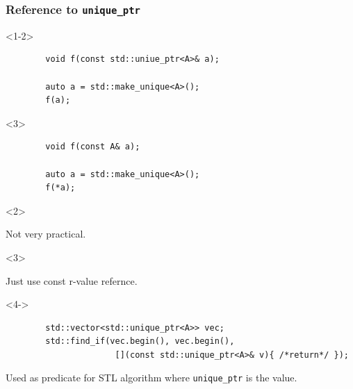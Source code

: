 \documentclass{beamer}
\begin{document}
\begin{frame}[fragile,t]
\frametitle{Reference to \texttt{unique\_ptr}}
    \begin{onlyenv}<1-2>
    \begin{lstlisting}
        void f(const std::uniue_ptr<A>& a);

        auto a = std::make_unique<A>();
        f(a);
    \end{lstlisting}
    \end{onlyenv}

    \begin{onlyenv}<3>
    \begin{lstlisting}
        void f(const A& a);

        auto a = std::make_unique<A>();
        f(*a);
    \end{lstlisting}
    \end{onlyenv}

    \begin{onlyenv}<2>
    \begin{alertblock}{}
        Not very practical.
    \end{alertblock}
    \end{onlyenv}
    \begin{onlyenv}<3>
    \begin{block}{}
        Just use const r-value refernce.
    \end{block}
    \end{onlyenv}
    \begin{onlyenv}<4->
    \begin{lstlisting}
        std::vector<std::unique_ptr<A>> vec;
        std::find_if(vec.begin(), vec.begin(), 
                      [](const std::unique_ptr<A>& v){ /*return*/ });
    \end{lstlisting}
    \begin{block}{}
        Used as predicate for STL algorithm where \texttt{unique\_ptr} is the value.
    \end{block}
    \end{onlyenv}
\end{frame}
\end{document}
